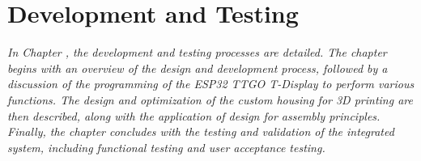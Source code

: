 \chapter{Development and Testing}
\label{chapter:development}

\textit{In Chapter \thechapter, the development and testing processes are detailed. The chapter begins with an overview of the design and development process, followed by a discussion of the programming of the ESP32 TTGO T-Display to perform various functions. The design and optimization of the custom housing for 3D printing are then described, along with the application of design for assembly principles. Finally, the chapter concludes with the testing and validation of the integrated system, including functional testing and user acceptance testing.}


